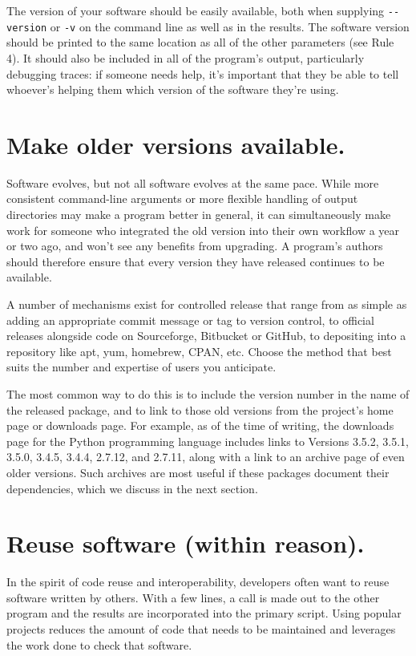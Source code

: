 \documentclass[10pt,letterpaper]{article}
\begin{document}
The version of your software should be easily available, both when
supplying \texttt{-\/-version} or \texttt{-v} on the command line as
well as in the results. The software version should be printed to the
same location as all of the other parameters (see Rule 4).  It should
also be included in all of the program's output, particularly debugging
traces: if someone needs help, it's important that they be able to tell
whoever's helping them which version of the software they're using.

\section{Make older versions available.}

Software evolves, but not all software evolves at the same pace.
While more consistent command-line arguments
or more flexible handling of output directories
may make a program better in general,
it can simultaneously make work for someone
who integrated the old version into their own workflow a year or two ago,
and won't see any benefits from upgrading.
A program's authors should therefore ensure that every version they have released
continues to be available.

A number of mechanisms exist for
controlled release that range from as simple as adding an appropriate
commit message or tag to version control, to official releases alongside
code on Sourceforge, Bitbucket or GitHub, to depositing into a
repository like apt, yum, homebrew, CPAN, etc. Choose the method that
best suits the number and expertise of users you anticipate.

The most common way to do this is to include the version number in the
name of the released package, and to link to those old versions from
the project's home page or downloads page.
For example,
as of the time of writing,
the downloads page for the Python programming language includes links to
Versions 3.5.2, 3.5.1, 3.5.0, 3.4.5, 3.4.4, 2.7.12, and 2.7.11,
along with a link to an archive page of even older versions.
Such archives are most useful if these packages document their dependencies,
which we discuss in the next section.

\section{Reuse software (within reason).}

In the spirit of code reuse and interoperability, developers often want
to reuse software written by others. 
With a few lines, a call
is made out to the other program and the results are incorporated into the
primary script. Using popular projects reduces the amount of code that
needs to be maintained and leverages the work done to check that software.
\end{document}
